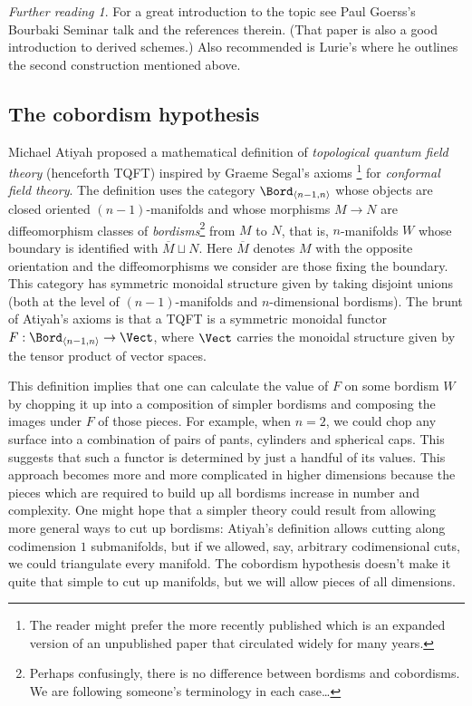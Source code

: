 \documentclass[12pt]{amsart}
\theoremstyle{definition} \newtheorem{definition}[theorem]{Definition}
\theoremstyle{remark} \newtheorem{remark}[theorem]{Remark}
\newtheorem*{further}{Further reading}
\numberwithin{equation}{section}
\begin{document}
\begin{further}
  For a great introduction to the topic see Paul Goerss's
  Bourbaki Seminar talk \cite{Goerss} and the references therein.
  (That paper is also a good introduction to derived schemes.)
  Also recommended is Lurie's \cite{LurieTMF} where he outlines the
  second construction mentioned above.
\end{further}


\subsection{The cobordism hypothesis}

Michael Atiyah \cite{Atiyah} proposed a mathematical definition of
\emph{topological quantum field theory} (henceforth TQFT) inspired by
Graeme Segal's axioms \cite{SegalCFT}\footnote{The reader might prefer
  the more recently published \cite{SegalCFT2} which is an expanded
  version of an unpublished paper that circulated widely for many
  years.} for \emph{conformal field theory}. The definition uses the
category $\Bord_{\langle n-1,n\rangle}$ whose objects are closed
oriented $(n-1)$-manifolds and whose morphisms $M \to N$ are
diffeomorphism classes of \emph{bordisms}\footnote{Perhaps
  confusingly, there is no difference between bordisms and
  cobordisms. We are following someone's terminology in each
  case\dots} from $M$ to $N$, that is, $n$-manifolds $W$ whose
boundary is identified with $\overline{M} \sqcup N$. Here
$\overline{M}$ denotes $M$ with the opposite orientation and the
diffeomorphisms we consider are those fixing the boundary.  This
category has symmetric monoidal structure given by taking disjoint
unions (both at the level of $(n-1)$-manifolds and $n$-dimensional
bordisms). The brunt of Atiyah's axioms is that a TQFT is a symmetric
monoidal functor $F : \Bord_{\langle n-1, n\rangle} \to \Vect$, where
$\Vect$ carries the monoidal structure given by the tensor product of
vector spaces.

This definition implies that one can calculate the value of $F$ on
some bordism $W$ by chopping it up into a composition of simpler
bordisms and composing the images under $F$ of those pieces. For
example, when $n=2$, we could chop any surface into a combination of
pairs of pants, cylinders and spherical caps. This suggests that such
a functor is determined by just a handful of its values. This approach
becomes more and more complicated in higher dimensions because the
pieces which are required to build up all bordisms increase in number
and complexity. One might hope that a simpler theory could result from
allowing more general ways to cut up bordisms: Atiyah's definition
allows cutting along codimension $1$ submanifolds, but if we allowed,
say, arbitrary codimensional cuts, we could triangulate every
manifold. The cobordism hypothesis doesn't make it quite that simple
to cut up manifolds, but we will allow pieces of all dimensions.
\end{document}
